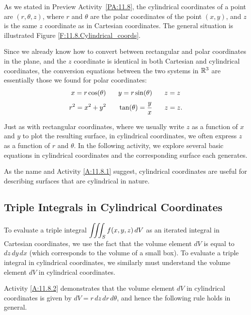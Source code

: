 As we stated in Preview Activity~\ref{PA:11.8}, the cylindrical coordinates of a point are $(r,\theta,z)$, where $r$ and $\theta$ are the polar coordinates of the point $(x, y)$, and $z$ is the same $z$ coordinate as in Cartesian coordinates.  The general situation is illustrated Figure \ref{F:11.8.Cylindrical_coords}.

Since we already know how to convert between rectangular and polar coordinates in the plane, and the $z$ coordinate is identical in both Cartesian and cylindrical coordinates, the conversion equations between the two systems in $\mathbb{R}^3$ are essentially those we found for polar coordinates:
\[x = r \cos(\theta) \hspace{0.25in} y = r \sin(\theta) \hspace{0.25in} z = z\]
\[r^2  = x^2  + y^2 \hspace{0.25in} \tan(\theta) = \frac{y}{x} \hspace{0.25in} z = z.\]

Just as with rectangular coordinates, where we usually write $z$ as a function of $x$ and $y$ to plot the resulting surface, in cylindrical coordinates, we often express $z$ as a function of $r$ and $\theta$.  In the following activity, we explore several basic equations in cylindrical coordinates and the corresponding surface each generates.




As the name and Activity \ref{A:11.8.1} suggest, cylindrical coordinates are useful for describing surfaces that are cylindrical in nature.

\subsection*{Triple Integrals in Cylindrical Coordinates}

To evaluate a triple integral $\displaystyle \iiint_S f(x,y,z) \, dV$ as an iterated integral in Cartesian coordinates, we use the fact that the volume element $dV$ is equal to $dz \, dy \, dx$ (which corresponds to the volume of a small box). To evaluate a triple integral in cylindrical coordinates, we similarly must understand the volume element $dV$ in cylindrical coordinates.



Activity \ref{A:11.8.2} demonstrates that the volume element $dV$ in cylindrical coordinates is given by $dV = r \, dz \, dr \, d\theta$, and hence the following rule holds in general.

